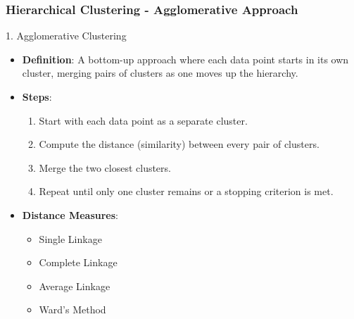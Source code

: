 \documentclass[aspectratio=169]{beamer}
\begin{document}
\begin{frame}[fragile]
  \frametitle{Hierarchical Clustering - Agglomerative Approach}
  \begin{block}{1. Agglomerative Clustering}
    \begin{itemize}
      \item \textbf{Definition}: A bottom-up approach where each data point starts in its own cluster, merging pairs of clusters as one moves up the hierarchy.
      \item \textbf{Steps}:
        \begin{enumerate}
          \item Start with each data point as a separate cluster.
          \item Compute the distance (similarity) between every pair of clusters.
          \item Merge the two closest clusters.
          \item Repeat until only one cluster remains or a stopping criterion is met.
        \end{enumerate}
      \item \textbf{Distance Measures}:
        \begin{itemize}
          \item Single Linkage
          \item Complete Linkage
          \item Average Linkage
          \item Ward's Method
        \end{itemize}
    \end{itemize}
  \end{block}
\end{frame}
\end{document}
